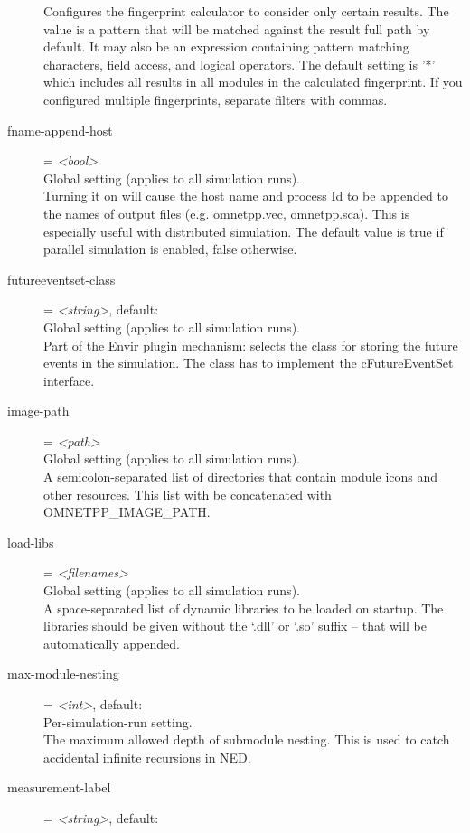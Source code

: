\begin{description}
    Configures the fingerprint calculator to consider only certain results. The
    value is a pattern that will be matched against the result full path by
    default. It may also be an expression containing pattern matching
    characters, field access, and logical operators. The default setting is '*'
    which includes all results in all modules in the calculated fingerprint. If
    you configured multiple fingerprints, separate filters with commas.
\item[fname-append-host] = \textit{<bool>}\\
    Global setting (applies to all simulation runs).\\
    Turning it on will cause the host name and process Id to be appended to the
    names of output files (e.g. omnetpp.vec, omnetpp.sca). This is especially
    useful with distributed simulation. The default value is true if parallel
    simulation is enabled, false otherwise.
\item[futureeventset-class] = \textit{<string>}, default: \\
    Global setting (applies to all simulation runs).\\
    Part of the Envir plugin mechanism: selects the class for storing the
    future events in the simulation. The class has to implement the
    cFutureEventSet interface.
\item[image-path] = \textit{<path>}\\
    Global setting (applies to all simulation runs).\\
    A semicolon-separated list of directories that contain module icons and
    other resources. This list with be concatenated with OMNETPP\_IMAGE\_PATH.
\item[load-libs] = \textit{<filenames>}\\
    Global setting (applies to all simulation runs).\\
    A space-separated list of dynamic libraries to be loaded on startup. The
    libraries should be given without the `.dll' or `.so' suffix -- that will
    be automatically appended.
\item[max-module-nesting] = \textit{<int>}, default: \\
    Per-simulation-run setting.\\
    The maximum allowed depth of submodule nesting. This is used to catch
    accidental infinite recursions in NED.
\item[measurement-label] = \textit{<string>}, default: \\

\end{description}
